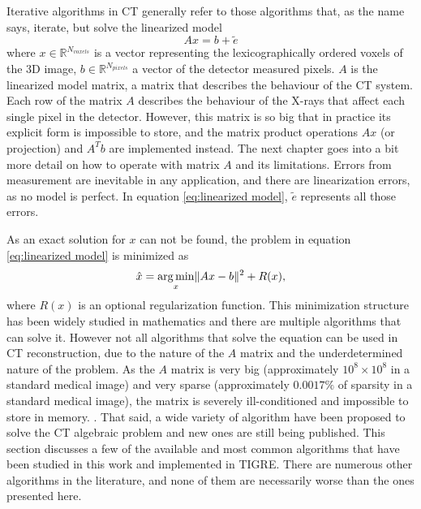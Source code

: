 Iterative algorithms in CT generally refer to those algorithms that, as the name says, iterate, but solve the linearized model 
\begin{equation}
Ax=b+\tilde{e} \label{eq:linearized model}
\end{equation}
 where $x\in \mathbb{R}^{N_{voxels}}$ is a vector representing the lexicographically ordered voxels of the 3D image, $b\in \mathbb{R}^{N_{pixels}} $ a vector of the detector measured pixels. $A$ is the linearized model matrix, a matrix that describes the behaviour of the CT system. Each row of the matrix $A$ describes the behaviour of the X-rays that affect each single pixel in the detector. However, this matrix is so big that in practice its explicit form is impossible to store, and the matrix product operations $Ax$ (or projection) and $A^Tb$ are implemented instead. The next chapter goes into a bit more detail on how to operate with matrix $A$ and its limitations. Errors from measurement are inevitable in any application, and there are linearization errors, as no model is perfect. In equation \ref{eq:linearized model}, $\tilde{e}$ represents all those errors.

As an exact solution for $x$ can not be found, the problem in equation \ref{eq:linearized model} is minimized as
\begin{equation}
\hat{x}=\mathop{\mathrm{arg\,min}}_x \lVert Ax-b\rVert^2+R(x),\label{eq:THE equation}
\end{equation}
 where $R(x)$ is an optional regularization function.  This minimization structure has been widely studied in mathematics and there are multiple algorithms that can solve it. However not all algorithms that solve the equation can be used in CT reconstruction, due to the nature of the $A$ matrix and the underdetermined nature of the problem. As the $A$ matrix is very big (approximately $10^8\times 10^8$ in a standard medical image) and very sparse (approximately $0.0017\%$ of sparsity in a standard medical image), the matrix is severely ill-conditioned and impossible to store in memory. . That said, a wide variety of algorithm have been proposed to solve the CT algebraic problem and new ones are still being published. This section discusses a few of the available and most common algorithms that have been studied in this work and implemented in TIGRE. There are numerous other algorithms in the literature, and none of them are necessarily worse than the ones presented here.


